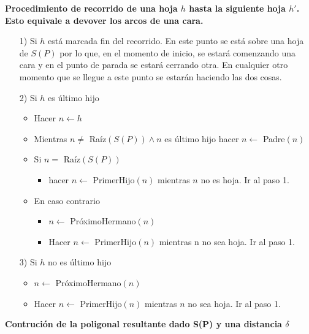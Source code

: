 \documentclass[12pt,english]{report}
\begin{document}
\textbf{Procedimiento de recorrido de una hoja $h$ hasta la siguiente hoja $h'$. Esto equivale a devover los arcos de una cara.}
\begin{itemize}
	\item[1)]	Si $h$ est\'a marcada fin del recorrido. En este punto se est\'a sobre una hoja de $S(P)$ por lo que, en el momento de inicio, se estar\'a comenzando una cara y en el punto de parada se estar\'a cerrando otra. En cualquier otro momento que se llegue a este punto se estar\'an haciendo las dos cosas. 
	\item[2)] Si $h$ es \'ultimo hijo	
\begin{itemize}
	\item Hacer $n \leftarrow h$
	\item Mientras $n \neq$ Ra\'iz$(S(P))\wedge n$ es \'ultimo hijo hacer $n \leftarrow $ Padre$(n)$
	\item Si $n =$ Ra\'iz$(S(P))$ 
\begin{itemize}
	\item hacer $n \leftarrow$ PrimerHijo$(n)$ mientras $n$ no es hoja. Ir al paso 1.
\end{itemize}		
	\item En caso contrario
\begin{itemize}
	\item $n \leftarrow$ Pr\'oximoHermano$(n)$
	\item Hacer $n \leftarrow$ PrimerHijo$(n)$ mientras n no sea hoja. Ir al paso 1.
\end{itemize}
\end{itemize}
	\item[3)] Si $h$ no es \'ultimo hijo	
\begin{itemize}
	\item $n \leftarrow$ Pr\'oximoHermano$(n)$
	\item Hacer $n \leftarrow$ PrimerHijo$(n)$ mientras $n$ no sea hoja. Ir al paso 1.  
	
\end{itemize} 
\end{itemize}
\bigskip
\textbf{Contruci\'on de la poligonal resultante dado S(P) y una distancia $\delta$}
\end{document}
